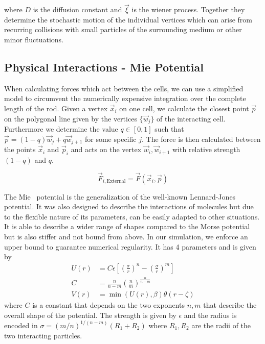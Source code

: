 \documentclass{article}
\begin{document}
where $D$ is the diffusion constant and $\vec{\xi}$ is the wiener process.
Together they determine the stochastic motion of the individual vertices which can arise from
recurring collisions with small particles of the surrounding medium or other minor fluctuations.

\subsection{Physical Interactions - Mie Potential}

When calculating forces which act between the cells, we can use a simplified model to circumvent the
numerically expensive integration over the complete length of the rod.
Given a vertex $\vec{x}_i$ on one cell, we calculate the closest point $\vec{p}$ on the polygonal
line given by the vertices $\{\vec{w}_j\}$ of the interacting cell.
Furthermore we determine the value $q\in[0,1]$ such that $\vec{p} = (1-q)\vec{w}_j + q\vec{w}_{j+1}$
for some specific $j$.
The force is then calculated between the points $\vec{x}_i$ and $\vec{p}_i$ and acts on
the vertex $\vec{w}_i,\vec{w}_{i+1}$ with relative strength $(1-q)$ and $q$.

\begin{equation}
    \vec{F}_{i,\text{External}} = \vec{F}(\vec{x}_i,\vec{p})
\end{equation}

The Mie~\cite{Mie1903} potential is the generalization of the well-known
Lennard-Jones~\cite{Jones1924} potential.
It was also designed to describe the interactions of molecules but due to the flexible nature of its
parameters, can be easily adapted to other situations.
It is able to describe a wider range of shapes compared to the Morse potential but is also stiffer
and not bound from above.
In our simulation, we enforce an upper bound to guarantee numerical regularity.
It has 4 parameters and is given by
\begin{align}
    U(r) &= C\epsilon\left[ \left(\frac{\sigma}{r}\right)^n -
        \left(\frac{\sigma}{r}\right)^m\right]\\
    C &= \frac{n}{n-m}\left(\frac{n}{m}\right)^{\frac{n}{n-m}}\\
    V(r) &= \min(U(r), \beta)\theta(r-\zeta)
\end{align}
where $C$ is a constant that depends on the two exponents $n,m$ that describe the overall shape of
the potential.
The strength is given by $\epsilon$ and the radius is encoded in $\sigma =
(m/n)^{1/(n-m)}(R_1+R_2)$ where $R_1,R_2$ are the radii of the two interacting particles.
\end{document}
